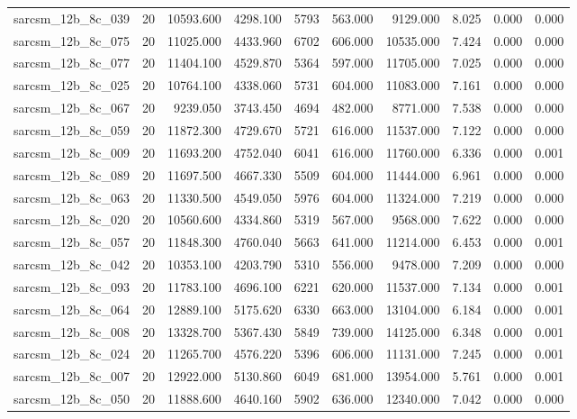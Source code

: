 \begin{tabular}{lrrrrrrrrr}
sarcsm\_12b\_8c\_039 & 20 & 10593.600 & 4298.100 & 5793 & 563.000 & 9129.000 & 8.025 & 0.000 & 0.000 \\
sarcsm\_12b\_8c\_075 & 20 & 11025.000 & 4433.960 & 6702 & 606.000 & 10535.000 & 7.424 & 0.000 & 0.000 \\
sarcsm\_12b\_8c\_077 & 20 & 11404.100 & 4529.870 & 5364 & 597.000 & 11705.000 & 7.025 & 0.000 & 0.000 \\
sarcsm\_12b\_8c\_025 & 20 & 10764.100 & 4338.060 & 5731 & 604.000 & 11083.000 & 7.161 & 0.000 & 0.000 \\
sarcsm\_12b\_8c\_067 & 20 & 9239.050 & 3743.450 & 4694 & 482.000 & 8771.000 & 7.538 & 0.000 & 0.000 \\
sarcsm\_12b\_8c\_059 & 20 & 11872.300 & 4729.670 & 5721 & 616.000 & 11537.000 & 7.122 & 0.000 & 0.000 \\
sarcsm\_12b\_8c\_009 & 20 & 11693.200 & 4752.040 & 6041 & 616.000 & 11760.000 & 6.336 & 0.000 & 0.001 \\
sarcsm\_12b\_8c\_089 & 20 & 11697.500 & 4667.330 & 5509 & 604.000 & 11444.000 & 6.961 & 0.000 & 0.000 \\
sarcsm\_12b\_8c\_063 & 20 & 11330.500 & 4549.050 & 5976 & 604.000 & 11324.000 & 7.219 & 0.000 & 0.000 \\
sarcsm\_12b\_8c\_020 & 20 & 10560.600 & 4334.860 & 5319 & 567.000 & 9568.000 & 7.622 & 0.000 & 0.000 \\
sarcsm\_12b\_8c\_057 & 20 & 11848.300 & 4760.040 & 5663 & 641.000 & 11214.000 & 6.453 & 0.000 & 0.001 \\
sarcsm\_12b\_8c\_042 & 20 & 10353.100 & 4203.790 & 5310 & 556.000 & 9478.000 & 7.209 & 0.000 & 0.000 \\
sarcsm\_12b\_8c\_093 & 20 & 11783.100 & 4696.100 & 6221 & 620.000 & 11537.000 & 7.134 & 0.000 & 0.001 \\
sarcsm\_12b\_8c\_064 & 20 & 12889.100 & 5175.620 & 6330 & 663.000 & 13104.000 & 6.184 & 0.000 & 0.001 \\
sarcsm\_12b\_8c\_008 & 20 & 13328.700 & 5367.430 & 5849 & 739.000 & 14125.000 & 6.348 & 0.000 & 0.001 \\
sarcsm\_12b\_8c\_024 & 20 & 11265.700 & 4576.220 & 5396 & 606.000 & 11131.000 & 7.245 & 0.000 & 0.001 \\
sarcsm\_12b\_8c\_007 & 20 & 12922.000 & 5130.860 & 6049 & 681.000 & 13954.000 & 5.761 & 0.000 & 0.001 \\
sarcsm\_12b\_8c\_050 & 20 & 11888.600 & 4640.160 & 5902 & 636.000 & 12340.000 & 7.042 & 0.000 & 0.000 \\

\end{tabular}

